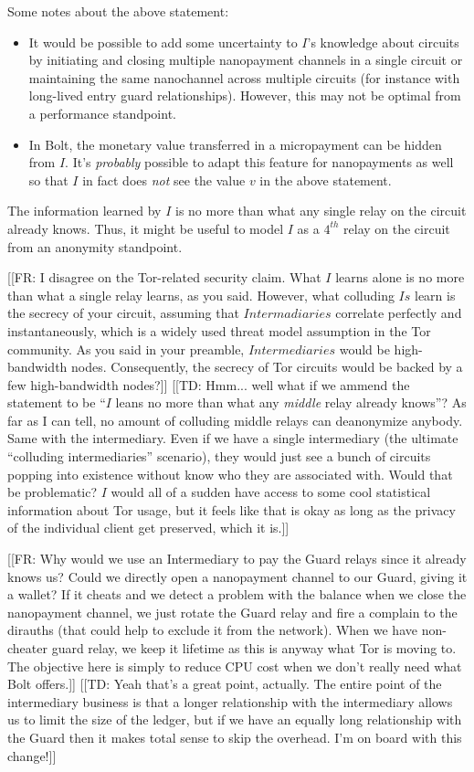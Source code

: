\documentclass{article}
\newcommand{\flo}[1]{ {\color{blue} [[FR: #1]]}}
\newcommand{\dinh}[1]{ {\color{brown} [[TD: #1]]}}
\begin{document}
Some notes about the above statement:
\begin{itemize}
\item It would be possible to add some uncertainty to $I$'s knowledge about circuits by initiating and closing multiple nanopayment channels in a single circuit or maintaining the same nanochannel across multiple circuits (for instance with long-lived entry guard relationships). However, this may not be optimal from a performance standpoint.
\item In Bolt, the monetary value transferred in a micropayment can be hidden from $I$. It's \emph{probably} possible to adapt this feature for nanopayments as well so that $I$ in fact does \emph{not} see the value $v$ in the above statement.
\end{itemize}
The information learned by $I$ is no more than what any single relay on the circuit already knows. Thus, it might be useful to model $I$ as a $4^{th}$ relay on the circuit from an anonymity standpoint.

\flo{I disagree on the Tor-related security claim. What $I$ learns alone is no more than what a single relay learns, as you said. However, what colluding $Is$ learn is the secrecy of your circuit, assuming that $Intermadiaries$ correlate perfectly and instantaneously, which is a widely used threat model assumption in the Tor community. As you said in your preamble, $Intermediaries$ would be high-bandwidth nodes. Consequently, the secrecy of Tor circuits would be backed by a few high-bandwidth nodes?}
\dinh{Hmm... well what if we ammend the statement to be ``$I$ leans no more than what any \emph{middle} relay already knows''? As far as I can tell, no amount of colluding middle relays can deanonymize anybody. Same with the intermediary. Even if we have a single intermediary (the ultimate ``colluding intermediaries'' scenario), they would just see a bunch of circuits popping into existence without know who they are associated with. Would that be problematic? $I$ would all of a sudden have access to some cool statistical information about Tor usage, but it feels like that is okay as long as the privacy of the individual client get preserved, which it is.}

\flo{Why would we use an Intermediary to pay the Guard relays since it already knows us? Could we directly open a nanopayment channel to our Guard, giving it a wallet? If it cheats and we detect a problem with the balance when we close the nanopayment channel, we just rotate the Guard relay and fire a complain to the dirauths (that could help to exclude it from the network). When we have non-cheater guard relay, we keep it lifetime as this is anyway what Tor is moving to. The objective here is simply to reduce CPU cost when we don't really need what Bolt offers.}
\dinh{Yeah that's a great point, actually. The entire point of the intermediary business is that a longer relationship with the intermediary allows us to limit the size of the ledger, but if we have an equally long relationship with the Guard then it makes total sense to skip the overhead. I'm on board with this change!}
\end{document}
